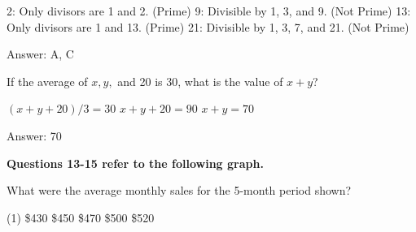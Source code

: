 \documentclass[11pt,paper=a4,answers]{exam}
\begin{document}
\begin{questions}
\begin{solution}
\begin{center}
2: Only divisors are 1 and 2. (Prime)
\vspace{5pt}
9: Divisible by 1, 3, and 9. (Not Prime)
\vspace{5pt}
13: Only divisors are 1 and 13. (Prime)
\vspace{5pt}
21: Divisible by 1, 3, 7, and 21. (Not Prime)
\end{center}

Answer: \colorbox{yellow!100}{A, C}
\end{solution}

\vspace{1cm}


\question
If the average of $x, y,$ and 20 is 30, what is the value of $x + y$?

\begin{solution}
\begin{center}
$(x + y + 20) / 3 = 30$
\vspace{5pt}
$x + y + 20 = 90$
\vspace{5pt}
$x + y = 70$
\end{center}

Answer: \colorbox{yellow!100}{70}
\end{solution}

\vspace{1cm}

\textbf{Questions 13-15 refer to the following graph.}

\begin{center}
\end{center}

\question
What were the average monthly sales for the 5-month period shown?

\begin{tasks}(1)
\task[A)] \$430 \task[B)] \$450 \task[C)] \$470 \task[D)] \$500 \task[E)] \$520
\end{tasks}


\end{questions}
\end{document}
